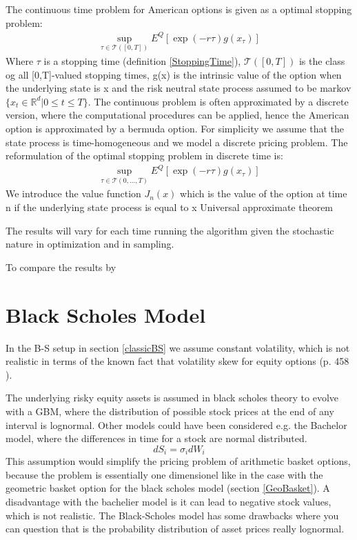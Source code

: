 The continuous time problem for American options is given as a optimal stopping problem:
\begin{align}
\sup_{\tau \in \mathcal{T}([0,T])} E^Q[\exp(-r\tau)g(x_{\tau})]
\end{align}
Where $\tau$ is a stopping time (definition \ref{StoppingTime}), $\mathcal{T}([0,T])$ is the class og all [0,T]-valued stopping times, g(x) is the intrinsic value of the option when the underlying state is x and the risk neutral state process assumed to be markov $\{x_t \in \mathbb{R}^{d} | 0 \leq t \leq T\}$. The continuous problem is often approximated by a discrete version, where the computational procedures can be applied, hence the American option is approximated by a bermuda option. For simplicity we assume that the state process is time-homogeneous and we model a discrete pricing problem. The reformulation of the optimal stopping problem in discrete time is:
\begin{align*}
\sup_{\tau \in \mathcal{T}(0,\ldots,T)} E^Q[\exp(-r\tau)g(x_{\tau})]
\end{align*}
We introduce the value function $J_n(x)$ which is the value of the option at time n if the underlying state process is equal to x
Universal approximate theorem

The results will vary for each time running the algorithm given the stochastic nature in optimization and in sampling.


To compare the results by 


\parencite{liaw2018tune}

\section{Black Scholes Model}
In the B-S setup in section \ref{classicBS} we assume constant volatility, which is not realistic in terms of the known fact that volatility skew for equity options (p. 458 \parencite{Hull}).

The underlying risky equity assets is assumed in black scholes theory to evolve with a GBM, where the distribution of possible stock prices at the end of any interval is lognormal. Other models could have been considered e.g. the Bachelor model, where the differences in time for a stock are normal distributed. 
\begin{equation*}
dS_i=\sigma_i dW_i
\end{equation*}
This assumption would simplify the pricing problem of arithmetic basket options, because the problem is essentially one dimensionel like in the case with the geometric basket option for the black scholes model (section \ref{GeoBasket}). A disadvantage with the bachelier model is it can lead to negative stock values, which is not realistic. The Black-Scholes model has some drawbacks where you can question that is the probability distribution of asset prices really lognormal. \\

